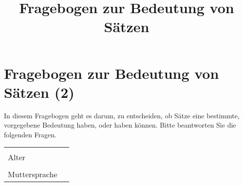 \documentclass[a4paper, 8pt]{article}
\title{Fragebogen zur Bedeutung von Sätzen}
\begin{document}
\section*{Fragebogen zur Bedeutung von Sätzen (2)}

In diesem Fragebogen geht es darum, zu entscheiden, ob Sätze eine bestimmte, vorgegebene Bedeutung haben, oder haben können. Bitte beantworten Sie die folgenden Fragen.


\begin{tabular}{|l|p{5cm}|}
\hline
& \\
Alter & \\
\hline
& \\
Muttersprache & \\
\hline
\end{tabular}
\end{document}
